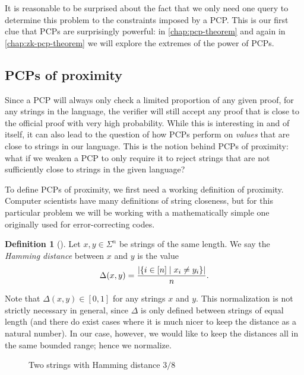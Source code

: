 \documentclass[english,12pt]{reedthesis}
\theoremstyle{plain}
\theoremstyle{definition}
\newtheorem{defn}[defn]{Definition}
\theoremstyle{remark}
\DeclarePairedDelimiter{\abs}{\lvert}{\rvert}
\begin{document}
It is reasonable to be surprised about the fact that we only need one query to
determine this problem to the constraints imposed by a PCP\@. This is our first
clue that PCPs are surprisingly powerful: in \cref{chap:pcp-theorem} and again
in \cref{chap:zk-pcp-theorem} we will explore the extremes of the power of PCPs.

\subsection{PCPs of proximity}\label{sec:pcpp}

Since a PCP will always only check a limited proportion of any given proof, for
any strings in the language, the verifier will still accept any proof that is
close to the official proof with very high probability. While this is
interesting in and of itself, it can also lead to the question of how PCPs
perform on \emph{values} that are close to strings in our language. This is the
notion behind PCPs of proximity: what if we weaken a PCP to only require it to
reject strings that are not sufficiently close to strings in the given language?

To define PCPs of proximity, we first need a working definition of proximity.
Computer scientists have many definitions of string closeness, but for this
particular problem we will be working with a mathematically simple one
originally used for error-correcting codes.

\begin{defn}[{\cite{Ham50}}]\label{def:hamming-dist}
  Let $x, y \in \Sigma^{n}$ be strings of the same length. We say the \emph{Hamming
    distance} between $x$ and $y$ is the value
  \[
    \Delta(x, y) = \frac{\abs{\{i \in [n] \mid x_{i} \ne y_{i}\}}}{n}.
  \]
\end{defn}

Note that $\Delta(x, y) \in [0, 1]$ for any strings $x$ and $y$. This normalization is
not strictly necessary in general, since $\Delta$ is only defined between strings of
equal length (and there do exist cases where it is much nicer to keep the
distance as a natural number). In our case, however, we would like to keep the
distances all in the same bounded range; hence we normalize.

\begin{figure}[htbp]
  \centering
  \caption{Two strings with Hamming distance $3/8$}\label{fig:hamming-dist}
\end{figure}
\end{document}
